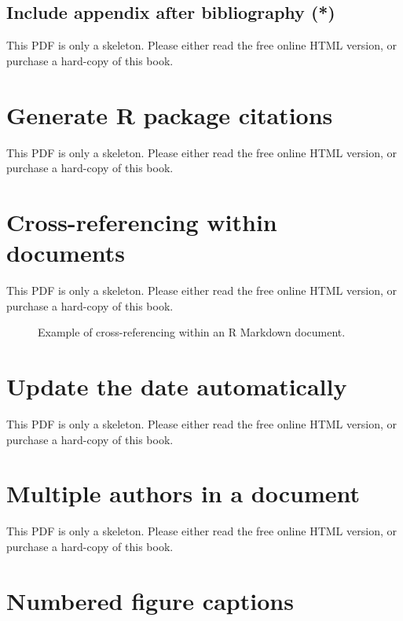 \documentclass[
  11pt,
]{krantz}
\begin{document}
\subsection{Include appendix after bibliography (*)}\label{include-appendix-after-bibliography}

This PDF is only a skeleton. Please either read the free online HTML version, or purchase a hard-copy of this book.

\section{Generate R package citations}\label{write-bib}

This PDF is only a skeleton. Please either read the free online HTML version, or purchase a hard-copy of this book.

\section{Cross-referencing within documents}\label{cross-ref}

This PDF is only a skeleton. Please either read the free online HTML version, or purchase a hard-copy of this book.

\begin{figure}\caption{Example of cross-referencing within an R Markdown document.}\end{figure}

\section{Update the date automatically}\label{update-date}

This PDF is only a skeleton. Please either read the free online HTML version, or purchase a hard-copy of this book.

\begin{table}\caption{\label{tab:date-format} Date and time formats in R.}\end{table}

\section{Multiple authors in a document}\label{multiple-authors}

This PDF is only a skeleton. Please either read the free online HTML version, or purchase a hard-copy of this book.

\section{Numbered figure captions}\label{figure-number}
\end{document}
